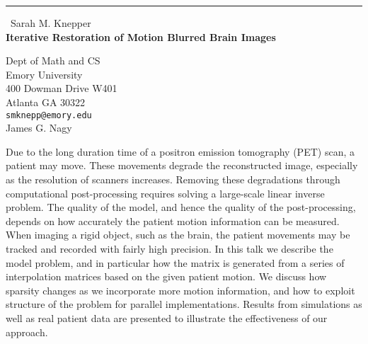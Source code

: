 \documentclass{report}
\begin{document}
\begin{center}
\rule{6in}{1pt} \
{\large Sarah M. Knepper \\
{\bf Iterative Restoration of Motion Blurred Brain Images}}

Dept of Math and CS \\ Emory University \\ 400 Dowman Drive W401 \\ Atlanta GA 30322
\\
{\tt smknepp@emory.edu}\\
James G. Nagy\end{center}

Due to the long duration time of a positron emission tomography (PET)
scan, a patient may move. These movements degrade the reconstructed
image, especially as the resolution of scanners increases. Removing these
degradations through computational post-processing requires solving a
large-scale linear inverse problem. The quality of the model, and hence
the quality of the post-processing, depends on how accurately the patient
motion information can be measured. When imaging a rigid object, such as
the brain, the patient movements may be tracked and recorded with fairly
high precision. In this talk we describe the model problem, and in
particular how the matrix is generated from a series of interpolation
matrices based on the given patient motion. We discuss how sparsity
changes as we incorporate more motion information, and how to exploit
structure of the problem for parallel implementations. Results from
simulations as well as real patient data are presented to illustrate the
effectiveness of our approach.
\end{document}
